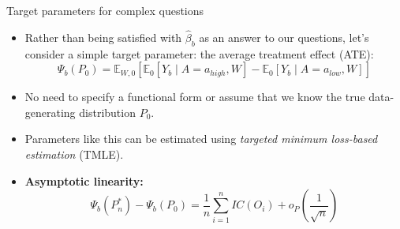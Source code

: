 \documentclass[12pt,t,handout]{beamer}
\begin{document}
\begin{frame}[c]{Target parameters for complex questions}

\begin{center}
\begin{itemize}
  \itemsep12pt
  \item Rather than being satisfied with $\hat{\beta}_{b}$ as an answer to our
    questions, let's consider a simple target parameter: the average treatment
    effect (ATE):
    \[
      \Psi_b(P_0) = \mathbb{E}_{W,0}[\mathbb{E}_0[Y_b \mid A = a_{high}, W] -
      \mathbb{E}_0[Y_b \mid A = a_{low}, W]]
    \]
  \item No need to specify a functional form or assume that we know the true
    data-generating distribution $P_0$.
  \item Parameters like this can be estimated using \textit{targeted minimum
    loss-based estimation} (TMLE).
  \item \textbf{Asymptotic linearity:}
    \[
      \Psi_b(P_n^*) - \Psi_b(P_0) = \frac{1}{n} \sum_{i = 1}^{n} IC(O_i) +
      o_P(\frac{1}{\sqrt{n}})
    \]
\end{itemize}
\end{center}

\end{frame}
\end{document}
